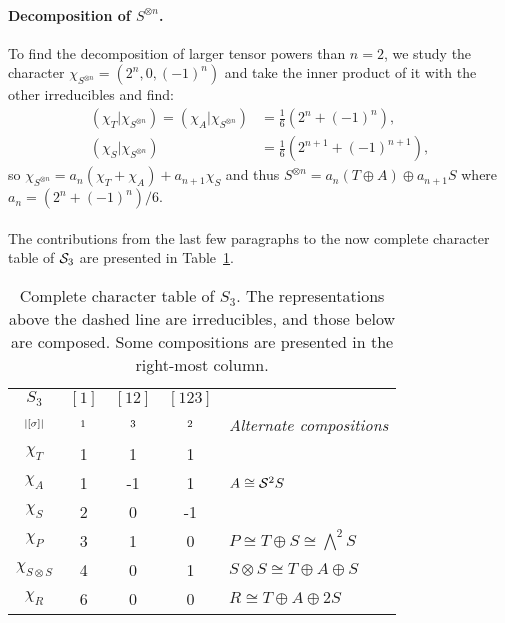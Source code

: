 \begin{example}
	\paragraph{Decomposition of $S^{\otimes n}$.}\cite[Exercise 2.7.]{FultonHarris} To find the decomposition of larger tensor powers than $n=2$, we study the character $\chi_{S^{\otimes n}} = (2^n, 0, (-1)^n)$ and take the inner product of it with the other irreducibles and find:
	\begin{align*}
		({\chi_T}|{\chi_{S^{\otimes n}}}) = ({\chi_A}|{\chi_{S^{\otimes n}}}) &= \frac{1}{6}\left(2^n + (-1)^n\right), \\
		({\chi_S}|{\chi_{S^{\otimes n}}}) &= \frac{1}{6}\left(2^{n+1} + (-1)^{n+1}\right), 
	\end{align*}
	so $\chi_{S^{\otimes n}} = a_n (\chi_T + \chi_A) + a_{n+1} \chi_S$ and thus $S^{\otimes n} = a_n (T \oplus A) \oplus a_{n+1} S$ where $a_n = \left(2^n + (-1)^n\right)/6$.
	
	\paragraph{} The contributions from the last few paragraphs to the now complete character table of $\mathcal{S}_3$ are presented in Table~\ref{table:completecharS3}.
	
	\begin{table}[hbt!]
		\centering
		
		\begin{tabular}{c | c c c | l}
			$S_3$         & $[1]$   & $[12]$  & $[123]$ &                                          \\
			$\scriptstyle|[\sigma]|$    & $\scriptstyle 1$ & $\scriptstyle 3$ & $\scriptstyle 2$ &  \textit{Alternate compositions}         \\ \hline
			$\chi_T$       & 1       & 1       & 1       &                                          \\
			$\chi_A$       & 1       & -1      & 1       & $ A \cong \mathcal{S}^2S$                       \\
			$\chi_S$       & 2       & 0       & -1      &                                          \\ \hline\hline
			$\chi_P$       & 3       & 1       & 0       & $ P \cong T \oplus S \cong \bigwedge^2S$ \\
			$\chi_{S \otimes S}$ & 4       & 0       & 1       & $ S \otimes S \cong T \oplus A \oplus S$ \\
			$\chi_R$       & 6       & 0       & 0       & $ R \cong T \oplus A \oplus 2S$
		\end{tabular}
			
		\caption{Complete character table of $S_3$. The representations above the dashed line are irreducibles, and those below are composed. Some compositions are presented in the right-most column.}
		\label{table:completecharS3}
	\end{table}
\end{example}

